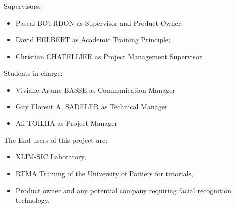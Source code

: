 Supervisors:
\begin{itemize}
\item	Pascal BOURDON as Supervisor and Product Owner;
\item	David HELBERT as Academic Training Principle;
\item	Christian CHATELLIER as Project Management Supervisor.
\end{itemize}
Students in charge:
\begin{itemize}
\item	Viviane Arame BASSE as Communication Manager
\item	Guy Florent A. SADELER as Technical Manager
\item	Ali TOILHA as Project Manager
\end{itemize}
The End users of this project are:
\begin{itemize}
\item	XLIM-SIC Laboratory,
\item	RTMA Training of the University of Poitiers for tutorials,
\item	Product owner and any potential company requiring facial recognition technology.
\end{itemize}





